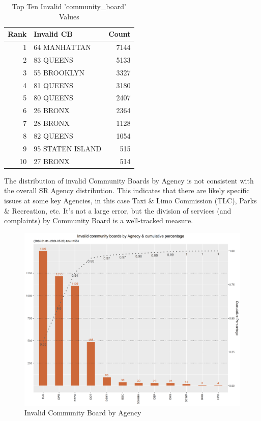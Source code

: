 \documentclass[12pt, titlepage]{article}
\begin{document}
		\begin{table}[H]
		\centering
		\small
		\caption{Top Ten Invalid 'community\_board' Values}
		\begin{tabular}{rlr}
		\toprule
		\textbf{Rank} & \textbf{Invalid CB} & \textbf{Count} \\
			\midrule
				1 & 64 MANHATTAN & 7144 \\
				2 & 83 QUEENS & 5133 \\
				3 & 55 BROOKLYN & 3327 \\
				4 & 81 QUEENS & 3180 \\
				5 & 80 QUEENS & 2407 \\
				6 & 26 BRONX & 2364 \\
				7 & 28 BRONX & 1128 \\
				8 & 82 QUEENS & 1054 \\
				9 & 95 STATEN ISLAND & 515 \\
				10 & 27 BRONX & 514 \\
			\bottomrule
		\end{tabular}
		\end{table}
		
		The distribution of invalid Community Boards by Agency is not consistent with the overall SR Agency distribution. This indicates that there are likely
		specific issues at some key Agencies, in this case Taxi \& Limo Commission (TLC), Parks \& Recreation, etc. It's not a large error, but the division of services
		(and complaints) by Community Board is a well-tracked measure.

		\begin{figure}[H]
	  \centering
		  \includegraphics[scale = 0.65]{invalid_community_boards.png}
		  \caption{Invalid Community Board by Agency}
		  \label{fig:invalid_community_boards}
	\end{figure}
\end{document}
